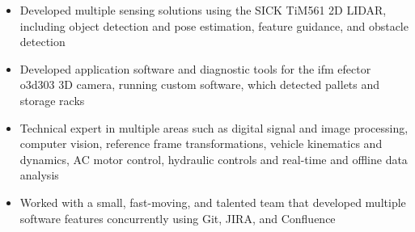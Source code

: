 	\begin{itemize} [leftmargin = \itemmargin]
		\item Developed multiple sensing solutions using the SICK TiM561 2D LIDAR, including object detection and pose estimation, feature guidance, and obstacle detection

		\item Developed application software and diagnostic tools for the ifm efector o3d303 3D camera, running custom software, which detected pallets and storage racks

		\item Technical expert in multiple areas such as digital signal and image processing, computer vision, reference frame transformations, 
		vehicle kinematics and dynamics, AC motor control, hydraulic controls and real-time and offline data analysis
		
		\item Worked with a small, fast-moving, and talented team that developed multiple software features concurrently using Git, JIRA, and Confluence
		
	\end{itemize} \\